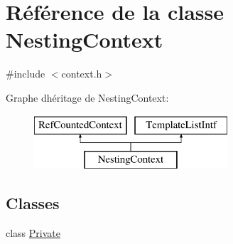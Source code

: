 \hypertarget{class_nesting_context}{}\section{Référence de la classe Nesting\+Context}
\label{class_nesting_context}


{\ttfamily \#include $<$context.\+h$>$}

Graphe d\textquotesingle{}héritage de Nesting\+Context\+:\begin{figure}[H]
\begin{center}
\leavevmode
\includegraphics[height=2.000000cm]{class_nesting_context}
\end{center}
\end{figure}
\subsection*{Classes}
\begin{DoxyCompactItemize}
\item 
class \hyperlink{class_nesting_context_1_1_private}{Private}
\end{DoxyCompactItemize}
